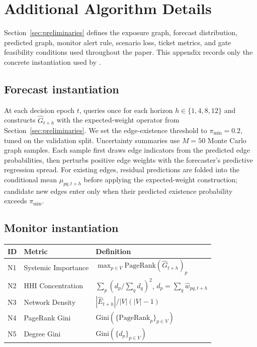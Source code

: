 \section{Additional Algorithm Details}
\label{app:pipeline-math}

Section~\ref{sec:preliminaries} defines the exposure graph, forecast
distribution, predicted graph, monitor alert rule, scenario loss, ticket
metrics, and gate feasibility conditions used throughout the paper. This
appendix records only the concrete instantiation used by \sysname{}.

\subsection{Forecast instantiation}
\label{app:fm-notation}

At each decision epoch $t$, \sysname{} queries \fmname{} once for each
horizon $h\in\{1,4,8,12\}$ and constructs $\widehat{G}_{t+h}$ with the
expected-weight operator from Section~\ref{sec:preliminaries}. We set the
edge-existence threshold to $\pi_{\min}=0.2$, tuned on the validation split.
Uncertainty summaries use $M=50$ Monte Carlo graph samples. Each sample first
draws edge indicators from the predicted edge probabilities, then perturbs
positive edge weights with the forecaster's predictive regression spread. For
existing edges, residual predictions are folded into the conditional mean
$\mu_{pq,t+h}$ before applying the expected-weight construction; candidate
new edges enter only when their predicted existence probability exceeds
$\pi_{\min}$.

\subsection{Monitor instantiation}

\begin{center}\small
\begin{tabular}{@{}lll@{}}
\toprule
ID & Metric                & Definition \\
\midrule
N1 & Systemic Importance  & $\max_{p\in V}\mathrm{PageRank}(\widehat{G}_{t+h})_p$ \\
N2 & HHI Concentration    & $\sum_p (d_p / \sum_q d_q)^2$, $d_p=\sum_q\widehat{w}_{pq,t+h}$ \\
N3 & Network Density      & $|\widehat{E}_{t+h}| / |V|(|V|-1)$ \\
N4 & PageRank Gini        & $\mathrm{Gini}(\{\mathrm{PageRank}_p\}_{p\in V})$ \\
N5 & Degree Gini          & $\mathrm{Gini}(\{d_p\}_{p\in V})$ \\
\bottomrule
\end{tabular}
\end{center}

